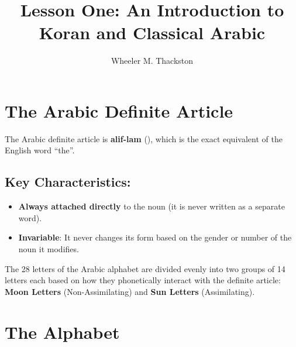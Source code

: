 \documentclass[11pt,a4paper]{article}
\title{\textbf{Lesson One: An Introduction to Koran and Classical Arabic}}
\author{Wheeler M. Thackston}
\date{}
\newcommand{\arb}[1]{{\arabicfont\RL{#1}}}
\begin{document}
\maketitle

\section*{The Arabic Definite Article}

The Arabic definite article is \textbf{alif-lam} (\arb{الـ}), which is the exact equivalent of the English word ``the''. 

\subsection*{Key Characteristics:}
\begin{itemize}
    \item \textbf{Always attached directly} to the noun (it is never written as a separate word).
    \item \textbf{Invariable}: It never changes its form based on the gender or number of the noun it modifies.
\end{itemize}

The 28 letters of the Arabic alphabet are divided evenly into two groups of 14 letters each based on how they phonetically interact with the definite article: \textbf{Moon Letters} (Non-Assimilating) and \textbf{Sun Letters} (Assimilating).

\section*{The Alphabet}
\end{document}
